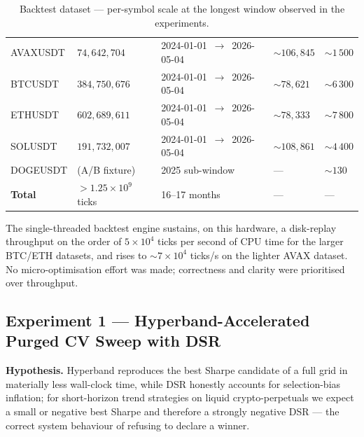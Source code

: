\documentclass[a4paper, 12pt, titlepage]{article}
\begin{document}
\begin{table}[H]
    \centering
    \small
    \caption{Backtest dataset --- per-symbol scale at the longest
    window observed in the experiments.}
    \label{tab:dataset}
    \begin{tabularx}{\textwidth}{l Y Y Y Y}
        \toprule
         & 
            & 
            & 
            &  \\
        \midrule
        AVAXUSDT & $74{,}642{,}704$ & 2024-01-01 \,$\rightarrow$\, 2026-05-04
                 & $\sim 106{,}845$  & $\sim 1\,500$ \\
        BTCUSDT  & $384{,}750{,}676$ & 2024-01-01 \,$\rightarrow$\, 2026-05-04
                 & $\sim 78{,}621$   & $\sim 6\,300$ \\
        ETHUSDT  & $602{,}689{,}611$ & 2024-01-01 \,$\rightarrow$\, 2026-05-04
                 & $\sim 78{,}333$   & $\sim 7\,800$ \\
        SOLUSDT  & $191{,}732{,}007$ & 2024-01-01 \,$\rightarrow$\, 2026-05-04
                 & $\sim 108{,}861$  & $\sim 4\,400$ \\
        DOGEUSDT & (A/B fixture)     & 2025 sub-window
                 & ---               & $\sim 130$ \\
        \midrule
        \textbf{Total} & $> 1.25\times 10^9$ ticks & 16--17 months
                 & ---           & --- \\
        \bottomrule
    \end{tabularx}
\end{table}

The single-threaded backtest engine sustains, on this hardware, a
disk-replay throughput on the order of $5\times 10^4$ ticks per
second of CPU time for the larger BTC/ETH datasets, and rises to
$\sim 7\times 10^4$ ticks/s on the lighter AVAX dataset. No
micro-optimisation effort was made; correctness and clarity were
prioritised over throughput.

\subsection{Experiment 1 --- Hyperband-Accelerated Purged CV Sweep
with DSR}

\textbf{Hypothesis.} Hyperband reproduces the best Sharpe candidate
of a full grid in materially less wall-clock time, while DSR
honestly accounts for selection-bias inflation; for short-horizon
trend strategies on liquid crypto-perpetuals we expect a small or
negative best Sharpe and therefore a strongly negative DSR --- the
correct system behaviour of refusing to declare a winner.
\end{document}
